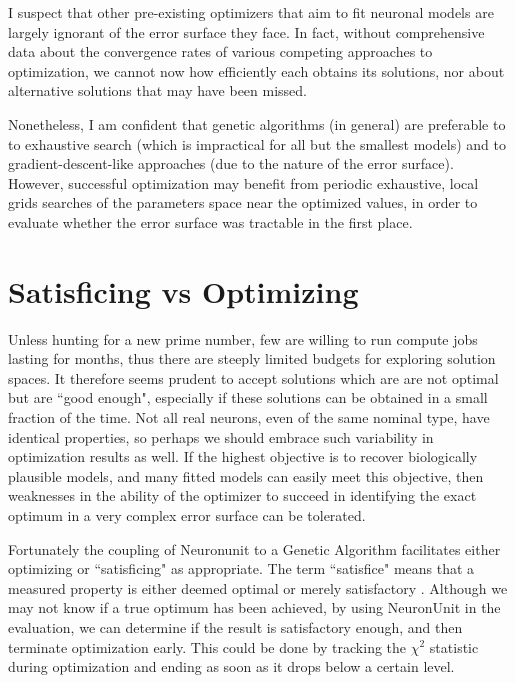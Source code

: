 I suspect that other pre-existing optimizers that aim to fit neuronal models are largely ignorant of the error surface they face.
In fact, without comprehensive data about the convergence rates of various competing approaches to optimization, we cannot now how efficiently each obtains its solutions, nor about alternative solutions that may have been missed.

Nonetheless, I am confident that genetic algorithms (in general) are preferable to to exhaustive search (which is impractical for all but the smallest models) and to gradient-descent-like approaches (due to the nature of the error surface).
However, successful optimization may benefit from periodic exhaustive, local grids searches of the parameters space near the optimized values, in order to evaluate whether the error surface was tractable in the first place.

\section{Satisficing vs Optimizing}
Unless hunting for a new prime number, few are willing to run compute jobs lasting for months, thus there are steeply limited budgets for exploring solution spaces. It therefore seems prudent to accept solutions which are are not optimal but are ``good enough", especially if these solutions can be obtained in a small fraction of the time.
Not all real neurons, even of the same nominal type, have identical properties, so perhaps we should embrace such variability in optimization results as well.
If the highest objective is to recover biologically plausible models, and many fitted models can easily meet this objective, then weaknesses in the ability of the optimizer to succeed in identifying the exact optimum in a very complex error surface can be tolerated.

Fortunately the coupling of Neuronunit to a Genetic Algorithm facilitates either optimizing or ``satisficing" as appropriate.
The term ``satisfice" means that a measured property is either deemed optimal or merely satisfactory \citep{simon1956rational}.
Although we may not know if a true optimum has been achieved, by using NeuronUnit in the evaluation, we can determine if the result is satisfactory enough, and then terminate optimization early.
This could be done by tracking the $\chi^2$ statistic during optimization and ending as soon as it drops below a certain level.
